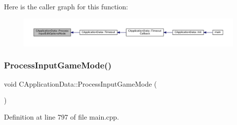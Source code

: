 Here is the caller graph for this function\+:\nopagebreak
\begin{figure}[H]
\begin{center}
\leavevmode
\includegraphics[width=350pt]{classCApplicationData_a345f47a19a5abcc9aeeb6b02b4aaf31b_icgraph}
\end{center}
\end{figure}
\hypertarget{classCApplicationData_a018490e670662ed9a9266449516a2ac7}{}\label{classCApplicationData_a018490e670662ed9a9266449516a2ac7} 
\subsubsection{\texorpdfstring{Process\+Input\+Game\+Mode()}{ProcessInputGameMode()}}
{\footnotesize\ttfamily void C\+Application\+Data\+::\+Process\+Input\+Game\+Mode (\begin{DoxyParamCaption}{ }\end{DoxyParamCaption})\hspace{0.3cm}{\ttfamily [protected]}}



Definition at line 797 of file main.\+cpp.


